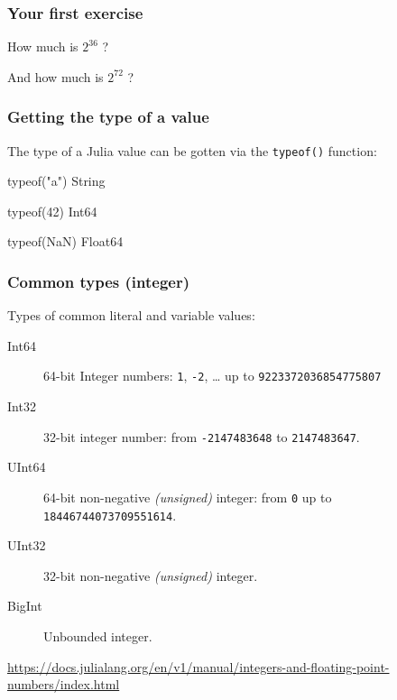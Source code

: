 \documentclass[english,serif,mathserif,xcolor=pdftex,dvipsnames,table]{beamer}
\begin{document}
\begin{frame}
  \frametitle{Your first exercise}
    \begin{center}
      {\Large How much is {$2^{36}$} ?}

      \+
      {\Large And how much is {$2^{72}$} ?}
    \end{center}
\end{frame}


\begin{frame}[fragile]
  \frametitle{Getting the type of a value}

  The type of a Julia value can be gotten via the \texttt{typeof()} function:
\begin{semiverbatim}
\julia typeof("a")
String

\julia typeof(42)
Int64

\julia typeof(NaN)
Float64
\end{semiverbatim}
\end{frame}


\begin{frame}[fragile]
  \frametitle{Common types (integer)}

  Types of common literal and variable values:
  \begin{description}
  \item[Int64] 64-bit Integer numbers: \texttt{1}, \texttt{-2}, \ldots
    up to \texttt{9223372036854775807}
  \item[Int32] 32-bit integer number: from \texttt{-2147483648} to \texttt{2147483647}.
  \item[UInt64] 64-bit non-negative \emph{(unsigned)} integer: from
    \texttt{0} up to \texttt{18446744073709551614}.
  \item[UInt32] 32-bit non-negative \emph{(unsigned)} integer.
  \item[BigInt] Unbounded integer.
  \end{description}

  \+
  \begin{references}
    \url{https://docs.julialang.org/en/v1/manual/integers-and-floating-point-numbers/index.html}
  \end{references}
\end{frame}
\end{document}
